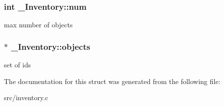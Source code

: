 \subsubsection[{\texorpdfstring{num}{num}}]{\setlength{\rightskip}{0pt plus 5cm}int \+\_\+\+Inventory\+::num}\hypertarget{struct__Inventory_a230ffe8c2f84e67f284d43f8a8622d53}{}\label{struct__Inventory_a230ffe8c2f84e67f284d43f8a8622d53}
max number of objects 
\subsubsection[{\texorpdfstring{objects}{objects}}]{$\ast$ \+\_\+\+Inventory\+::objects}\hypertarget{struct__Inventory_a478e4b50a62b9e7d5b17e335319faa97}{}\label{struct__Inventory_a478e4b50a62b9e7d5b17e335319faa97}
set of ids 

The documentation for this struct was generated from the following file\+:\begin{DoxyCompactItemize}
\item 
src/inventory.\+c\end{DoxyCompactItemize}
